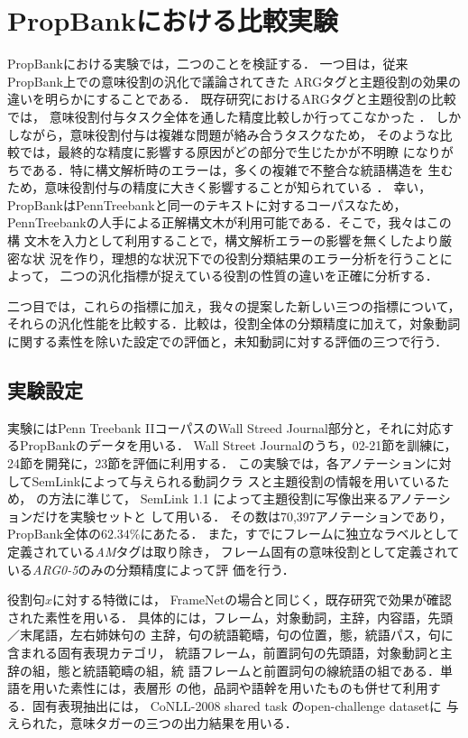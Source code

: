 \documentclass[japanese]{jnlp_1.4}
\begin{document}
\section{PropBankにおける比較実験}

PropBankにおける実験では，二つのことを検証する．
一つ目は，従来PropBank上での意味役割の汎化で議論されてきた
ARGタグと主題役割の効果の違いを明らかにすることである．
既存研究におけるARGタグと主題役割の比較では，
意味役割付与タスク全体を通した精度比較しか行ってこなかった
．
しかしながら，意味役割付与は複雑な問題が絡み合うタスクなため，
そのような比較では，最終的な精度に影響する原因がどの部分で生じたかが不明瞭
になりがちである．特に構文解析時のエラーは，多くの複雑で不整合な統語構造を
生むため，意味役割付与の精度に大きく影響することが知られている
．
幸い，PropBankはPennTreebankと同一のテキストに対するコーパスなため，
PennTreebankの人手による正解構文木が利用可能である．そこで，我々はこの構
文木を入力として利用することで，構文解析エラーの影響を無くしたより厳密な状
況を作り，理想的な状況下での役割分類結果のエラー分析を行うことによって，
二つの汎化指標が捉えている役割の性質の違いを正確に分析する．

二つ目では，これらの指標に加え，我々の提案した新しい三つの指標について，
それらの汎化性能を比較する．比較は，役割全体の分類精度に加えて，対象動詞
に関する素性を除いた設定での評価と，未知動詞に対する評価の三つで行う．


\subsection{実験設定}
\label{sec:propbank-setting}

実験にはPenn Treebank IIコーパスのWall Streed Journal部分と，それに対応するPropBankのデータを用いる．
Wall Street Journalのうち，02-21節を訓練に，24節を開発に，23節を評価に利用する．
この実験では，各アノテーションに対してSemLinkによって与えられる動詞クラ
スと主題役割の情報を用いているため，
の方法に準じて，
SemLink 1.1 によって主題役割に写像出来るアノテーションだけを実験セットと
して用いる．
その数は70,397アノテーションであり，PropBank全体の$62.34\%$にあたる．
また，すでにフレームに独立なラベルとして定義されている{\it AM}タグは取り除き，
フレーム固有の意味役割として定義されている{\it ARG0-5}のみの分類精度によって評
価を行う．


役割句$x$に対する特徴には，
FrameNetの場合と同じく，既存研究で効果が確認された素性を用いる．
具体的には，フレーム，対象動詞，主辞，内容語，先頭／末尾語，左右姉妹句の
主辞，句の統語範疇，句の位置，態，統語パス，句に含まれる固有表現カテゴリ，
統語フレーム，前置詞句の先頭語，対象動詞と主辞の組，態と統語範疇の組，統
語フレームと前置詞句の線統語の組である．単語を用いた素性には，表層形
の他，品詞や語幹を用いたものも併せて利用する．固有表現抽出には，
CoNLL-2008 shared task のopen-challenge datasetに
与えられた，意味タガーの三つの出力結果を用いる．
\end{document}
